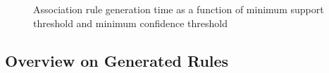 \begin{figure}[htp]


 
\caption{Association rule generation time as a function of minimum support threshold and minimum confidence threshold}
\label{figure:analysis-runtime}
\end{figure}  

\subsection{Overview on Generated Rules}